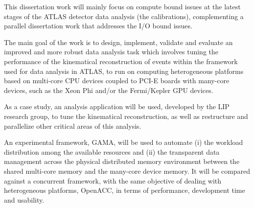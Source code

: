 This dissertation work will mainly focus on compute bound issues at the latest stages of the ATLAS detector data analysis (the calibrations), complementing a parallel dissertation work that addresses the I/O bound issues.

The main goal of the work is to design, implement, validate and evaluate an improved and more robust data analysis task which involves tuning the performance of the kinematical reconstruction of events within the framework used for data analysis in ATLAS, to run on computing heterogeneous platforms based on multi-core CPU devices coupled to PCI-E boards with many-core devices, such as the \intel Xeon Phi and/or the \nvidia Fermi/Kepler GPU devices.

As a case study, an analysis application will be used, developed by the LIP research group, to tune the kinematical reconstruction, as well as restructure and parallelize other critical areas of this analysis.

An experimental framework, GAMA, will be used to automate (i) the workload distribution among the available resources and (ii) the transparent data management across the physical distributed memory environment between the shared multi-core memory and the many-core device memory. It will be compared against a concurrent framework, with the same objective of dealing with heterogeneous platforms, OpenACC, in terms of performance, development time and usability.

\newpage
{}
